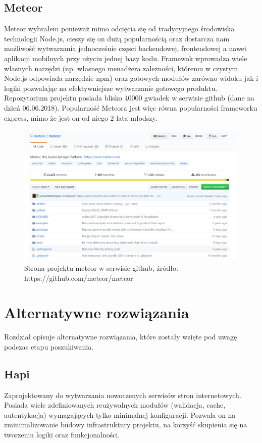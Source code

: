 \documentclass[12pt]{report}
\begin{document}
    \subsection{Meteor}
      Meteor wybrałem ponieważ mimo odcięcia się od tradycyjnego środowiska technologii Node.js, cieszy się on dużą popularnością oraz dostarcza nam możliwość wytwarzania jednocześnie częsci backendowej, frontendowej a nawet aplikacji mobilnych przy użyciu jednej bazy kodu.
      Framewok wprowadza wiele własnych narzędzi (np. własnego menadżera zależności, któremu w czystym Node.js odpowiada narzędzie npm) oraz gotowych modułów zarówno widoku jak i logiki pozwalając na efektywniejsze wytwarzanie gotowego produktu.
      Repozytorium projektu posiada blisko 40000 gwiadek w serwisie github (dane na dzień 06.06.2018).
      Popularność Meteora jest więc równa popularności frameworku express, mimo że jest on od niego 2 lata młodszy.
      \begin{figure}[!hb]
        \centering
        \includegraphics[width=\textwidth,height=\textheight,keepaspectratio]{meteor.png} 
        \caption{Strona projektu meteor w serwisie github, źródło: https://github.com/meteor/meteor}
      \end{figure}
  
  \section{Alternatywne rozwiązania}
    Rozdział opisuje alternatywne rozwiązania, które zostały wzięte pod uwagę podczas etapu poszukiwania.

    \subsection{Hapi}
    Zaprojektowany do wytwarzania nowoczenych serwisów stron internetowych.
    Posiada wiele zdefiniowanych reużywalnych modułów (walidacja, cache, autentykacja) wymagających tylko minimalnej konfiguracji.
    Pozwala on na zminimalizowanie budowy infrastruktury projektu, na korzyść skupienia się na tworzeniu logiki oraz funkcjonalności.
\end{document}
